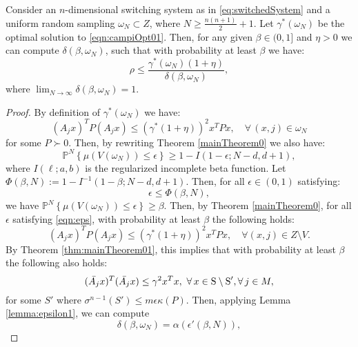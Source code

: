 
\begin{theorem}\label{thm:mainTheorem}Consider an $n$-dimensional switching system as in \eqref{eq:switchedSystem} and a uniform random sampling $\omega_N \subset Z$, where $N \geq \frac{n(n+1)}{2}+1$. Let $\gamma^*(\omega_N) $ be the optimal solution to \eqref{eqn:campiOpt01}. Then, for any given $\beta \in (0,1]$ and $\eta > 0$ we can compute $\delta(\beta, \omega_N)$, such that with probability at least $\beta$ we have:
$$\rho \leq \frac{\gamma^*(\omega_N) (1+ \eta)}{\delta(\beta, \omega_N)},$$
where $\lim_{N \to \infty}\delta(\beta, \omega_N) = 1$.
\end{theorem}

\begin{proof}
By definition of $\gamma^*(\omega_N)$ we have:
\begin{equation*} (A_j x)^TP(A_j x) \leq {(\gamma^*(1+\eta))}^2 x^TPx, \quad \forall\, (x, j)  \in \omega_N \end{equation*}
for some $P \succ 0$. 
Then, by rewriting Theorem \ref{mainTheorem0} we also have:
\begin{equation}\label{eqn:violation2}\mathbb{P}^N\left\{ \mu(V(\omega_N)) \leq \epsilon \right\} \geq 1- I(1-\epsilon; N-d, d+1),\end{equation}
where $I(\ell;a,b)$ is the regularized incomplete beta function. Let $\Phi(\beta, N):=1- I^{-1}(1-\beta; N-d, d+1)$. Then, for all $\epsilon \in (0,1)$ satisfying:
\begin{equation}\label{eqn:eps}\epsilon \leq \Phi(\beta, N),\end{equation} we have $\mathbb{P}^N\left\{ \mu(V(\omega_N)) \leq \epsilon \right\} \geq \beta$.
Then, by Theorem \ref{mainTheorem0}, for all $\epsilon$ satisfying \eqref{eqn:eps}, with probability at least $\beta$ the following holds:
\begin{equation*} (A_jx)^TP(A_jx) \leq  {(\gamma^*(1+\eta))}^2 x^TPx, \quad \forall (x, j) \in Z \setminus V.\end{equation*}
By Theorem \ref{thm:mainTheorem01}, this implies that with probability at least $\beta$ the following also holds:
\begin{equation*}(\bar{A_j} x)^T(\bar{A_j} x) \leq {\gamma}^2x^Tx,\,\, \forall\, x \in \text{S} \setminus \text{S}', \forall\, j \in M,\end{equation*}
for some $S'$ where $\sigma^{n-1}(S') \leq m\epsilon \kappa(P).$ Then, applying Lemma \ref{lemma:epsilon1}, we can compute
$$\delta(\beta, \omega_N) =\alpha(\epsilon'(\beta,N)),$$

\end{proof}
